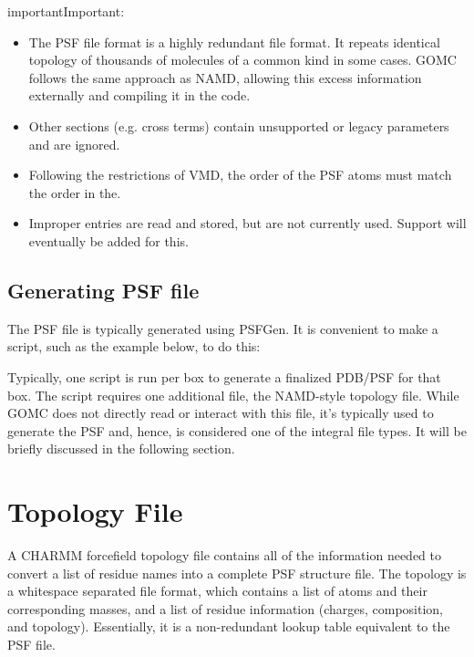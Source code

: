 \documentclass[letterpaper,10pt,english]{sphinxmanual}
\begin{document}
\begin{sphinxadmonition}{important}{Important:}\begin{itemize}
\item {} 
The PSF file format is a highly redundant file format. It repeats identical topology of thousands of molecules of a common kind in some cases. GOMC follows the same approach as NAMD, allowing this excess information externally and compiling it in the code.

\item {} 
Other sections (e.g. cross terms) contain unsupported or legacy parameters and are ignored.

\item {} 
Following the restrictions of VMD, the order of the PSF atoms must match the order in the.

\item {} 
Improper entries are read and stored, but are not currently used. Support will eventually be added for this.

\end{itemize}
\end{sphinxadmonition}


\subsection{Generating PSF file}
\label{\detokenize{input_file:generating-psf-file}}
The PSF file is typically generated using PSFGen. It is convenient to make a script, such as the example below, to do this:

Typically, one script is run per box to generate a finalized PDB/PSF for that box. The script requires one additional file, the NAMD-style topology file. While GOMC does not directly read or interact with this file, it’s typically used to generate the PSF and, hence, is considered one of the integral file types. It will be briefly discussed in the following section.


\section{Topology File}
\label{\detokenize{input_file:topology-file}}
A CHARMM forcefield topology file contains all of the information needed to convert a list of residue names into a complete PSF structure file. The topology is a whitespace separated file format, which contains a list of atoms and their corresponding masses, and a list of residue information (charges, composition, and topology). Essentially, it is a non-redundant lookup table equivalent to the PSF file.
\end{document}
